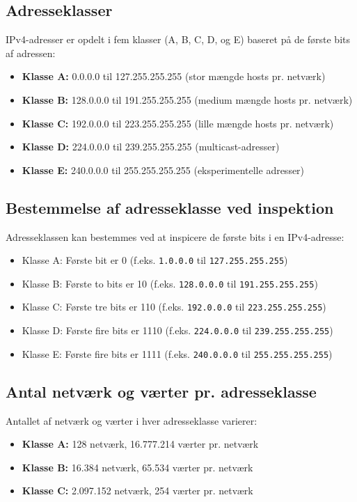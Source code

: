 \subsection{Adresseklasser}
IPv4-adresser er opdelt i fem klasser (A, B, C, D, og E) baseret på de første bits af adressen:

\begin{itemize}
	\item \textbf{Klasse A:} 0.0.0.0 til 127.255.255.255 (stor mængde hosts pr. netværk)
	\item \textbf{Klasse B:} 128.0.0.0 til 191.255.255.255 (medium mængde hosts pr. netværk)
	\item \textbf{Klasse C:} 192.0.0.0 til 223.255.255.255 (lille mængde hosts pr. netværk)
	\item \textbf{Klasse D:} 224.0.0.0 til 239.255.255.255 (multicast-adresser)
	\item \textbf{Klasse E:} 240.0.0.0 til 255.255.255.255 (eksperimentelle adresser)
\end{itemize}

\subsection{Bestemmelse af adresseklasse ved inspektion}
Adresseklassen kan bestemmes ved at inspicere de første bits i en IPv4-adresse:
\begin{itemize}
	\item Klasse A: Første bit er 0 (f.eks. \texttt{1.0.0.0} til \texttt{127.255.255.255})
	\item Klasse B: Første to bits er 10 (f.eks. \texttt{128.0.0.0} til \texttt{191.255.255.255})
	\item Klasse C: Første tre bits er 110 (f.eks. \texttt{192.0.0.0} til \texttt{223.255.255.255})
	\item Klasse D: Første fire bits er 1110 (f.eks. \texttt{224.0.0.0} til \texttt{239.255.255.255})
	\item Klasse E: Første fire bits er 1111 (f.eks. \texttt{240.0.0.0} til \texttt{255.255.255.255})
\end{itemize}

\subsection{Antal netværk og værter pr. adresseklasse}
Antallet af netværk og værter i hver adresseklasse varierer:

\begin{itemize}
	\item \textbf{Klasse A:} 128 netværk, 16.777.214 værter pr. netværk
	\item \textbf{Klasse B:} 16.384 netværk, 65.534 værter pr. netværk
	\item \textbf{Klasse C:} 2.097.152 netværk, 254 værter pr. netværk
\end{itemize}

